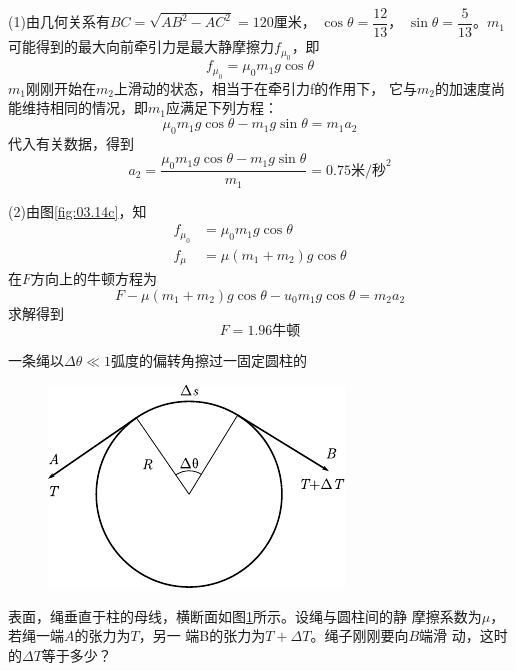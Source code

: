 (1)由几何关系有$  B C = \sqrt { A B ^ { 2 } - A C ^ { 2 } } = 1 2 0  $厘米，
$ \cos \theta = \dfrac { 1 2 } { 1 3 } $，
$ \sin \theta = \dfrac { 5 } { 1 3 } $。$ m _ { 1 }  $
可能得到的最大向前牵引力是最大静摩擦力$  f _ { \mu _ 0 }  $，即
\clearpage
~\vspace{-1.56em}
\begin{equation*}
	f _ {\mu _ 0 } = \mu _ { 0 } m _ { 1 } g \cos \theta
\end{equation*}
$m_1$刚刚开始在$m_2$上滑动的状态，相当于在牵引力f的作用下，
它与$m_2$的加速度尚能维持相同的情况，即$m_1$应满足下列方程：
\begin{equation*}
	\mu _ { 0 } m _ { 1 } g \cos \theta - m _ { 1 } g \sin \theta = m _ { 1 } a _ { 2 }
\end{equation*}
代入有关数据，得到
\begin{equation*}
	a _ { 2 } = \frac { \mu_{ 0 } m_1 g \cos \theta - m _ { 1 } g \sin \theta } { m _ { 1 } } = 0 . 7 5 \text{米/秒}^2
\end{equation*}

(2)由图\ref{fig:03.14c}，知
\begin{align*}
	f _ { \mu _ 0 } &= \mu _ { 0 } m _ { 1 } g \cos \theta \\
    f _ { \mu } &= \mu \left( m _ { 1 } + m _ { 2 } \right) g \cos \theta
\end{align*}
在$ F $方向上的牛顿方程为
\begin{equation*}
    F - \mu \left( m _ { 1 } + m _ { 2 } \right) g \cos \theta - u _ { 0 } m _ { 1 } g \cos \theta = m _ { 2 } a _ { 2 }
\end{equation*}
求解得到
\begin{equation*}
    F = 1 . 9 6 \text{牛顿}
\end{equation*}

\example 一条绳以$  \Delta \theta \ll 1  $弧度的偏转角擦过一固定圆柱的
\begin{figure}
	\centering
	\includegraphics{figure/fig03.15}
	\caption{}
	\label{fig:03.15}
\end{figure}
表面，绳垂直于柱的母线，横断面如图\ref{fig:03.15}\;所示。设绳与圆柱间的静
摩擦系数为$\mu$，若绳一端$ A $的张力为$ T $，另一
端B的张力为$  T + \Delta T $。绳子刚刚要向$ B $端滑
动，这时的$  \Delta T  $等于多少？

